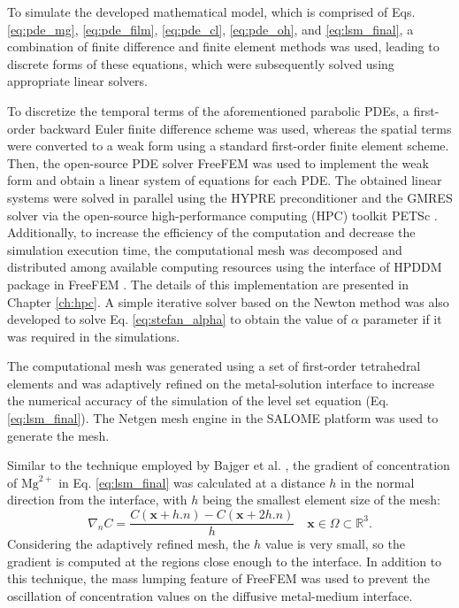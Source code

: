 To simulate the developed mathematical model, which is comprised of Eqs. \ref{eq:pde_mg}, \ref{eq:pde_film}, \ref{eq:pde_cl}, \ref{eq:pde_oh}, and \ref{eq:lsm_final}, a combination of finite difference and finite element methods was used, leading to discrete forms of these equations, which were subsequently solved using appropriate linear solvers.


To discretize the temporal terms of the aforementioned parabolic {PDE}s, a first-order backward Euler finite difference scheme was used, whereas the spatial terms were converted to a weak form using a standard first-order finite element scheme. Then, the open-source {PDE} solver FreeFEM \cite{Hecht2012} was used to implement the weak form and obtain a linear system of equations for each {PDE}. The obtained linear systems were solved in parallel using the HYPRE preconditioner \cite{Falgout2002} and the {GMRES} solver \cite{Saad1986} via the open-source high-performance computing ({HPC}) toolkit {PETSc} \cite{petsc}. Additionally, to increase the efficiency of the computation and decrease the simulation execution time, the computational mesh was decomposed and distributed among available computing resources using the interface of {HPDDM} package in FreeFEM \cite{Jolivet2013}. The details of this implementation are presented in Chapter \ref{ch:hpc}. A simple iterative solver based on the Newton method was also developed to solve Eq. \ref{eq:stefan_alpha} to obtain the value of $\alpha$ parameter if it was required in the simulations.

The computational mesh was generated using a set of first-order tetrahedral elements and was adaptively refined on the metal-solution interface to increase the numerical accuracy of the simulation of the level set equation (Eq. \ref{eq:lsm_final}). The Netgen mesh engine \cite{Schoeberl1997} in the SALOME platform \cite{Ribes2007} was used to generate the mesh.

Similar to the technique employed by Bajger et al. \cite{Bajger2016}, the gradient of concentration of $\mathrm{Mg}^{2+}$ in Eq. \ref{eq:lsm_final} was calculated at a distance $h$ in the normal direction from the interface, with $h$ being the smallest element size of the mesh:
\begin{equation} \label{eq:c_gradient}
\nabla_{n} C = \frac{C\left( \mathbf{x} + h.n \right) - C\left( \mathbf{x} + 2h.n \right)}{h} \quad \mathbf{x} \in \Omega \subset \mathbb{R}^{3}.
\end{equation}
Considering the adaptively refined mesh, the $h$ value is very small, so the gradient is computed at the regions close enough to the interface. In addition to this technique, the mass lumping feature of FreeFEM was used to prevent the oscillation of concentration values on the diffusive metal-medium interface.

